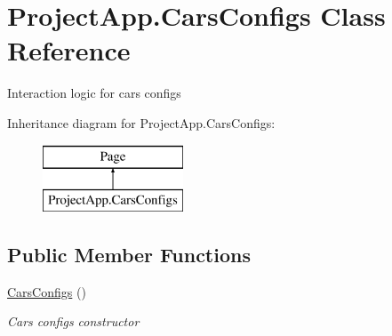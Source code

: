 \hypertarget{class_project_app_1_1_cars_configs}{}\section{Project\+App.\+Cars\+Configs Class Reference}
\label{class_project_app_1_1_cars_configs}


Interaction logic for cars configs  


Inheritance diagram for Project\+App.\+Cars\+Configs\+:\begin{figure}[H]
\begin{center}
\leavevmode
\includegraphics[height=2.000000cm]{class_project_app_1_1_cars_configs}
\end{center}
\end{figure}
\subsection*{Public Member Functions}
\begin{DoxyCompactItemize}
\item 
\mbox{\hyperlink{class_project_app_1_1_cars_configs_a8dacfe24f32ecb80820ecbbef629012f}{Cars\+Configs}} ()
\begin{DoxyCompactList}\small\item\em Cars configs constructor \end{DoxyCompactList}\end{DoxyCompactItemize}
